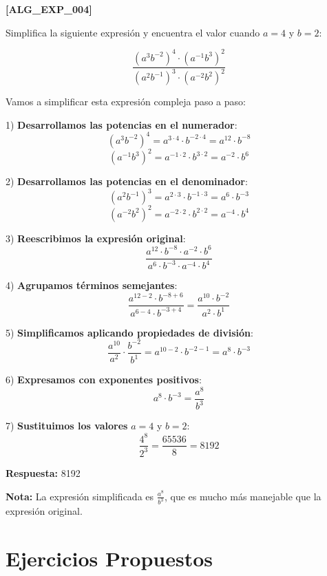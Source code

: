 \documentclass[12pt,a4paper]{book}
\newenvironment{ejercicio}[1][]{%
    \begin{trivlist}\item[\hskip \labelsep {\bfseries Ejercicio.}]
    \if\relax\detokenize{#1}\relax
    \else
        \textbf{[#1]}
    \fi
}{%
    \end{trivlist}
}
\newenvironment{solucion}{%
    \begin{trivlist}\item[\hskip \labelsep {\bfseries Solución.}]
    \color{blue}
}{%
    \color{black}
    \end{trivlist}
}
\begin{document}
\begin{ejercicio}[ALG\_EXP\_004]
Simplifica la siguiente expresión y encuentra el valor cuando $a = 4$ y $b = 2$:

$$\frac{(a^3 b^{-2})^4 \cdot (a^{-1} b^3)^2}{(a^2 b^{-1})^3 \cdot (a^{-2} b^2)^2}$$

\begin{solucion}
Vamos a simplificar esta expresión compleja paso a paso:

1) \textbf{Desarrollamos las potencias en el numerador}:
   $$(a^3 b^{-2})^4 = a^{3 \cdot 4} \cdot b^{-2 \cdot 4} = a^{12} \cdot b^{-8}$$
   $$(a^{-1} b^3)^2 = a^{-1 \cdot 2} \cdot b^{3 \cdot 2} = a^{-2} \cdot b^6$$

2) \textbf{Desarrollamos las potencias en el denominador}:
   $$(a^2 b^{-1})^3 = a^{2 \cdot 3} \cdot b^{-1 \cdot 3} = a^6 \cdot b^{-3}$$
   $$(a^{-2} b^2)^2 = a^{-2 \cdot 2} \cdot b^{2 \cdot 2} = a^{-4} \cdot b^4$$

3) \textbf{Reescribimos la expresión original}:
   $$\frac{a^{12} \cdot b^{-8} \cdot a^{-2} \cdot b^6}{a^6 \cdot b^{-3} \cdot a^{-4} \cdot b^4}$$

4) \textbf{Agrupamos términos semejantes}:
   $$\frac{a^{12-2} \cdot b^{-8+6}}{a^{6-4} \cdot b^{-3+4}} = \frac{a^{10} \cdot b^{-2}}{a^2 \cdot b^1}$$

5) \textbf{Simplificamos aplicando propiedades de división}:
   $$\frac{a^{10}}{a^2} \cdot \frac{b^{-2}}{b^1} = a^{10-2} \cdot b^{-2-1} = a^8 \cdot b^{-3}$$

6) \textbf{Expresamos con exponentes positivos}:
   $$a^8 \cdot b^{-3} = \frac{a^8}{b^3}$$

7) \textbf{Sustituimos los valores} $a = 4$ y $b = 2$:
   $$\frac{4^8}{2^3} = \frac{65536}{8} = 8192$$

\textbf{Respuesta:} 8192

\textbf{Nota:} La expresión simplificada es $\frac{a^8}{b^3}$, que es mucho más manejable que la expresión original.
\end{solucion}
\end{ejercicio}

\section{Ejercicios Propuestos}

\end{document}
